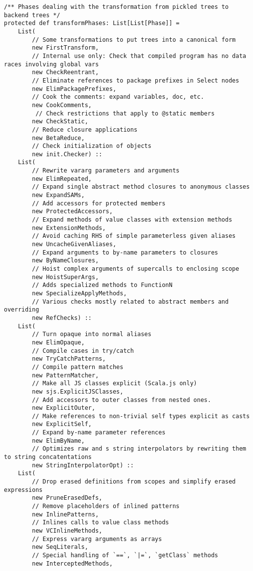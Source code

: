 \documentclass[letterpaper,12pt,titlepage,oneside,final]{book}
\begin{document}
\begin{verbatim}
/** Phases dealing with the transformation from pickled trees to backend trees */
protected def transformPhases: List[List[Phase]] =
	List(
		// Some transformations to put trees into a canonical form
		new FirstTransform,
		// Internal use only: Check that compiled program has no data races involving global vars         
		new CheckReentrant,
		// Eliminate references to package prefixes in Select nodes         
		new ElimPackagePrefixes,    
		// Cook the comments: expand variables, doc, etc.
		new CookComments,         
		 // Check restrictions that apply to @static members  
		new CheckStatic,   
		// Reduce closure applications        
		new BetaReduce,      
		// Check initialization of objects       
		new init.Checker) ::        
	List(
		// Rewrite vararg parameters and arguments
		new ElimRepeated,    
		// Expand single abstract method closures to anonymous classes       
		new ExpandSAMs,           
		// Add accessors for protected members  
		new ProtectedAccessors,    
		// Expand methods of value classes with extension methods 
		new ExtensionMethods,     
		// Avoid caching RHS of simple parameterless given aliases  
		new UncacheGivenAliases,   
		// Expand arguments to by-name parameters to closures
		new ByNameClosures,         
		// Hoist complex arguments of supercalls to enclosing scope
		new HoistSuperArgs,         
		// Adds specialized methods to FunctionN
		new SpecializeApplyMethods, 
		// Various checks mostly related to abstract members and overriding
		new RefChecks) ::           
	List(
	 	// Turn opaque into normal aliases
		new ElimOpaque,            
		// Compile cases in try/catch
		new TryCatchPatterns,      
		// Compile pattern matches
		new PatternMatcher,         
		// Make all JS classes explicit (Scala.js only)
		new sjs.ExplicitJSClasses,  
		// Add accessors to outer classes from nested ones.
		new ExplicitOuter,          
		// Make references to non-trivial self types explicit as casts
		new ExplicitSelf,           
		// Expand by-name parameter references
		new ElimByName,             
		// Optimizes raw and s string interpolators by rewriting them to string concatentations
		new StringInterpolatorOpt) :: 
	List(
	 	// Drop erased definitions from scopes and simplify erased expressions
		new PruneErasedDefs,
		// Remove placeholders of inlined patterns       
		new InlinePatterns,    
		// Inlines calls to value class methods     
		new VCInlineMethods,  
		// Express vararg arguments as arrays      
		new SeqLiterals, 
		// Special handling of `==`, `|=`, `getClass` methods           
		new InterceptedMethods, 

\end{verbatim}
\end{document}
